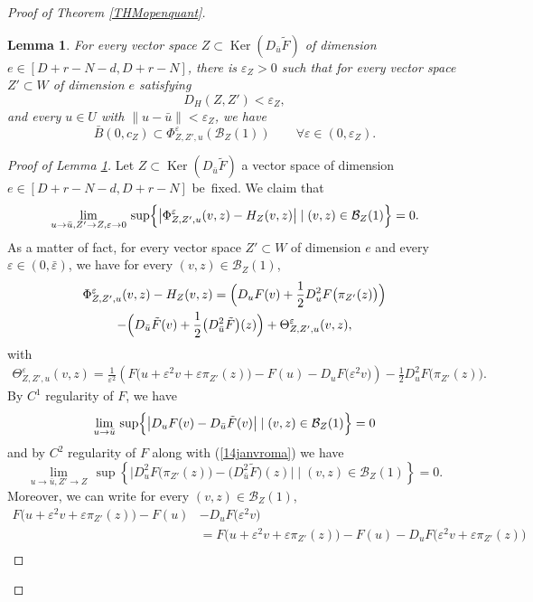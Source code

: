\documentclass[JEP,XML,SOM,Unicode,NoFloatCountersInSection,published]{cedram}
\let\epsilon\varepsilon
\let\sep\mid
\DeclareMathOperator{\Ker}{Ker}
\newtheorem{lemma}[theorem]{Lemma}
\theoremstyle{definition}
\begin{document}
\begin{proof}[Proof of Theorem \ref{THMopenquant}]
\skpt
\begin{lemma}\label{13janvsoir}
For every vector space $Z\subset \Ker (D_{\bar{u}} \tilde{F})$ of dimension $e\in [D+r-N-d,D+r-N]$, there is $\epsilon_Z>0$ such that for every vector space $Z'\subset W$ of dimension $e$ satisfying
\[
D_H(Z,Z') <\epsilon_Z,
\]
and every $u\in U$ with $\|u-\bar{u}\|<\epsilon_Z$, we have
\[
\bar{B}(0,c_Z)\subset \Phi_{Z,Z',u}^{\epsilon} \left(\mathcal{B}_Z(1)\right) \qquad \forall \epsilon \in (0,\epsilon_Z).
\]
\end{lemma}

\skpt
\begin{proof}[Proof of Lemma \ref{13janvsoir}]
Let $Z\subset \Ker (D_{\bar{u}} \tilde{F})$ a vector space of dimension $e\in [D+r-N-d,D+r-N]$ be~fixed. We claim that
\[
\lim_{u \to \bar{u}, Z' \to Z, \epsilon\to 0} \, \sup \Bigl\{ \left| \Phi_{Z,Z',u}^{\epsilon} (v,z) -H_Z(v,z) \right| \sep  (v,z) \in \mathcal{B}_Z(1) \Bigr\} =0.
\]
As a matter of fact, for every vector space $Z'\subset W$ of dimension $e$ and every $\epsilon \in (0,\bar{\epsilon})$, we have for every $(v,z)\in \mathcal{B}_Z(1)$,
\begin{multline*}
\Phi_{Z,Z',u}^{\epsilon} (v,z) -H_Z(v,z) = \Bigl(D_uF (v) +\frac{1}{2} D_u^2F \bigl(\pi_{Z'}(z)\bigr)\Bigr)\\ -\Bigl(D_{\bar{u}}\tilde{F} (v) + \frac{1}{2} \bigl(D^2_{\bar{u}} \tilde{F} \bigr) (z) \Bigr)
+ \Theta^{\epsilon}_{Z,Z',u}(v,z),
\end{multline*}
with
\begin{multline*}
\Theta^{\epsilon}_{Z,Z',u}(v,z) = \frac{1}{\epsilon^2} \left(F \bigl(u + \epsilon^2 v +\epsilon \pi_{Z'}(z) \bigr)-F(u) - D_uF \bigl(\epsilon^2 v\bigr) \right)- \frac{1}{2} D^2_uF\bigl(\pi_{Z'}(z) \bigr).
\end{multline*}
By $C^1$ regularity of $F$, we have
\[
\lim_{u\to \bar{u}} \, \sup \Bigl\{ \bigl| D_uF(v) - D_{\bar{u}}\tilde{F}(v) \bigr| \sep  (v,z) \in \mathcal{B}_Z(1) \Bigr\} =0
\]
and by $C^2$ regularity of $F$ along with (\ref{14janvroma}) we have
\[
\lim_{u\to \bar{u}, Z' \to Z} \, \sup \left\{ \bigl| D_u^2F \bigl(\pi_{Z'}(z)\bigr) - \bigl(D^2_{\bar{u}} \tilde{F} \bigr) (z) \bigr| \sep  (v,z) \in \mathcal{B}_Z(1) \right\} =0.
\]
Moreover, we can write for every $(v,z)\in \mathcal{B}_Z(1)$,
\begin{align*}
 F \bigl(u + \epsilon^2 v +\epsilon \pi_{Z'}(z) \bigr)-F(u) &- D_uF \bigl(\epsilon^2 v\bigr) \\
&= F \bigl(u + \epsilon^2 v +\epsilon \pi_{Z'}(z) \bigr)-F(u) - D_uF \bigl(\epsilon^2 v+\epsilon \pi_{Z'}(z)\bigr)\\

\end{align*}
\end{proof}
\end{proof}
\end{document}

